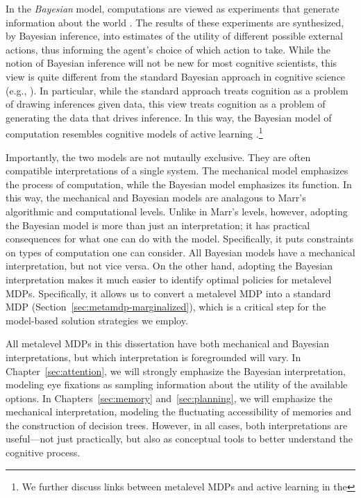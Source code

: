 In the \emph{Bayesian} model, computations are viewed as experiments that generate information about the world \citep{matheson1968economic}. The results of these experiments are synthesized, by Bayesian inference, into estimates of the utility of different possible external actions, thus informing the agent's choice of which action to take. While the notion of Bayesian inference will not be new for most cognitive scientists, this view is quite different from the standard Bayesian approach in cognitive science (e.g., \citealp{tenenbaum2011how}). In particular, while the standard approach treats cognition as a problem of drawing inferences given data, this view treats cognition as a problem of generating the data that drives inference. In this way, the Bayesian model of computation resembles cognitive models of active learning \citep{gureckis2012selfdirected,gottlieb2013informationseeking}.\footnote{We further discuss links between metalevel MDPs and active learning in the }

Importantly, the two models are not mutaully exclusive. They are often compatible interpretations of a single system. The mechanical model emphasizes the process of computation, while the Bayesian model emphasizes its function. In this way, the mechanical and Bayesian models are analagous to Marr's algorithmic and computational levels. Unlike in Marr's levels, however, adopting the Bayesian model is more than just an interpretation; it has practical consequences for what one can do with the model. Specifically, it puts constraints on types of computation one can consider. All Bayesian models have a mechanical interpretation, but not vice versa. On the other hand, adopting the Bayesian interpretation makes it much easier to identify optimal policies for metalevel MDPs. Specifically, it allows us to convert a metalevel MDP into a standard MDP (Section~\ref{sec:metamdp-marginalized}), which is a critical step for the model-based solution strategies we employ.

All metalevel MDPs in this dissertation have both mechanical and Bayesian interpretations, but which interpretation is foregrounded will vary. In Chapter~\ref{sec:attention}, we will strongly emphasize the Bayesian interpretation, modeling eye fixations as sampling information about the utility of the available options. In Chapters~\ref{sec:memory} and~\ref{sec:planning}, we will emphasize the mechanical interpretation, modeling the fluctuating accessibility of memories and the construction of decision trees. However, in all cases, both interpretations are useful---not just practically, but also as conceptual tools to better understand the cognitive process.

